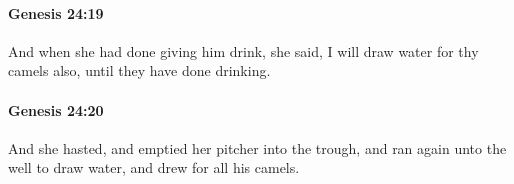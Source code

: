 		\paragraph{Genesis 24:19} %
			\label{GENESIS-24-19}

			And when she had done giving him drink, she said, I will draw water for thy camels also, until they have done drinking.


		\paragraph{Genesis 24:20} %
			\label{GENESIS-24-20}

			And she hasted, and emptied her pitcher into the trough, and ran again unto the well to draw water, and drew for all his camels.


